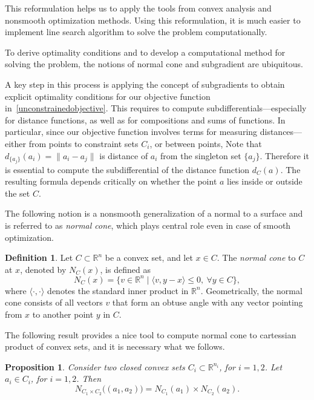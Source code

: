 \documentclass[12pt]{article}
\theoremstyle{plain}
\newtheorem{proposition}[theorem]{Proposition}
\theoremstyle{definition}
\newtheorem{definition}[theorem]{Definition}
\begin{document}
This reformulation helps us to apply the tools from convex analysis and nonsmooth optimization methods. Using this reformulation, it is much easier to implement line search algorithm to solve the problem computationally. 


To derive optimality conditions and to develop a computational method for solving the problem, the notions of normal cone and subgradient are ubiquitous.   

A key step in this process is applying the concept of subgradients to obtain explicit optimality conditions for our objective function in~\ref{unconstrainedobjective}. This requires to compute subdifferentials—especially for distance functions, as well as for compositions and sums of functions. In particular, since our objective function involves terms for measuring distances—either from points to constraint sets \( C_i \), or between points, Note that $d_{\{a_j\}}(a_i)=\|a_i-a_j\|$ is distance of $a_i$ from the singleton set $\{a_j\}$. Therefore it is essential to compute the subdifferential of the distance function \( d_C(a) \). The resulting formula depends critically on whether the point \( a \) lies inside or outside the set \( C \).

The following notion is a nonsmooth generalization of a normal to a surface and is referred to as \textit{normal cone}, which plays central role even in case of smooth optimization.

\begin{definition}
	Let $C \subset \mathbb{R}^n$ be a convex set, and let $x \in C$. The \textit{normal cone} to $C$ at $x$, denoted by $N_C(x)$, is defined as
	$$
	N_C(x) = \{ v \in \mathbb{R}^n \mid \langle v, y - x \rangle \leq 0, \ \forall y \in C \},
	$$
	where $\langle \cdot, \cdot \rangle$ denotes the standard inner product in $\mathbb{R}^n$. Geometrically, the normal cone consists of all vectors $v$ that form an obtuse angle with any vector pointing from $x$ to another point $y$ in $C$. 
\end{definition}

The following result provides a nice tool to compute normal cone to cartessian product of convex sets, and it is necessary what we follows.

\begin{proposition}\cite[Page 59, Proposition 2.39]{DhDu11} 
	Consider two closed convex sets $C_i \subset \mathbb{R}^{n_i}$, for $i = 1, 2$. 
	Let $a_i \in C_i$, for $i = 1, 2$. Then
	\[
	N_{C_1 \times C_2}\bigl((a_1, a_2)\bigr)
	= 
	N_{C_1}(a_1) 
	\times 
	N_{C_2}(a_2).
	\]
	\label{Normalcone_Product}
\end{proposition}
\end{document}
